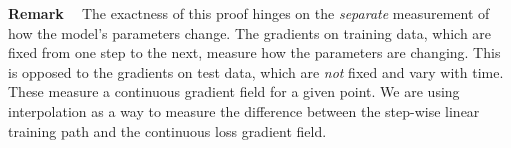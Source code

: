 \textbf{Remark ~} 
The exactness of this proof hinges on the \emph{separate} measurement of how the model's parameters change.
The gradients on training data, which are fixed from one step to the next, measure how the parameters are changing.
This is opposed to the gradients on test data, which are \textit{not} fixed and vary with time.
These measure a continuous gradient field for a given point.
We are using interpolation as a way to measure the difference between the step-wise linear training path and the continuous loss gradient field. 


